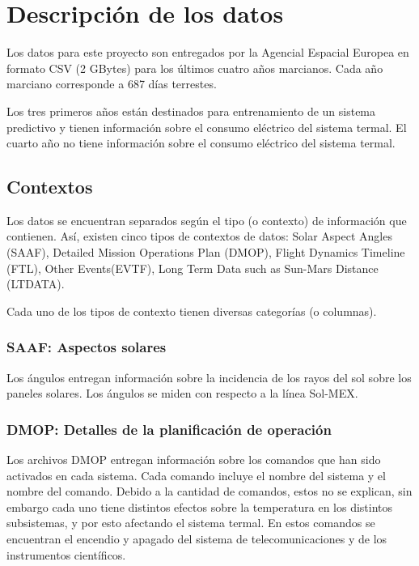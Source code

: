 \documentclass[../Main.tex]{subfiles}
\begin{document}
\section{Descripción de los datos}

Los datos para este proyecto son entregados por la Agencial Espacial Europea en formato CSV (2 GBytes) para los últimos cuatro años marcianos. Cada año marciano corresponde a 687 días terrestes.
\newline \par
Los tres primeros años están destinados para entrenamiento de un sistema predictivo y tienen información sobre el consumo eléctrico del sistema termal. El cuarto año no tiene información sobre el consumo eléctrico del sistema termal.
\subsection*{Contextos}
Los datos se encuentran separados según el tipo (o contexto) de información que contienen. Así, existen cinco tipos de contextos de datos: Solar Aspect Angles (SAAF), Detailed Mission Operations Plan (DMOP), Flight Dynamics Timeline (FTL), Other Events(EVTF), Long Term Data such as Sun-Mars Distance (LTDATA).
\newline \par

Cada uno de los tipos de contexto tienen diversas categorías (o columnas).
\subsubsection*{SAAF: Aspectos solares}
Los ángulos entregan información sobre la incidencia de los rayos del sol sobre los paneles solares. Los ángulos se miden con respecto a la línea Sol-MEX.
\subsubsection*{DMOP: Detalles de la planificación de operación}
Los archivos DMOP entregan información sobre los comandos que han sido activados en cada sistema. Cada comando incluye el nombre del sistema y el nombre del comando. Debido a la cantidad de comandos, estos no se explican, sin embargo cada uno tiene distintos efectos sobre la temperatura en los distintos subsistemas, y por esto afectando el sistema termal. En estos comandos se encuentran el encendio y apagado del sistema de telecomunicaciones y de los instrumentos científicos.
\end{document}
